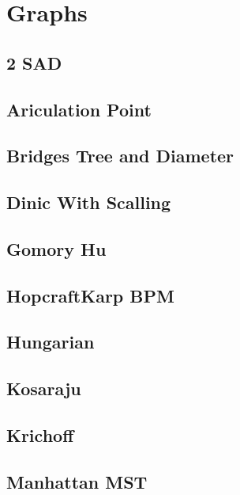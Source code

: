 \section{Graphs}
\subsection{2 SAD}
\raggedbottom
\hrulefill
\subsection{Ariculation Point}
\raggedbottom
\hrulefill
\subsection{Bridges Tree and Diameter}
\raggedbottom
\hrulefill
\subsection{Dinic With Scalling}
\raggedbottom
\hrulefill
\subsection{Gomory Hu}
\raggedbottom
\hrulefill
\subsection{HopcraftKarp BPM}
\raggedbottom
\hrulefill
\subsection{Hungarian}
\raggedbottom
\hrulefill
\subsection{Kosaraju}
\raggedbottom
\hrulefill
\subsection{Krichoff}
\raggedbottom
\hrulefill
\subsection{Manhattan MST}
\raggedbottom
\hrulefill
